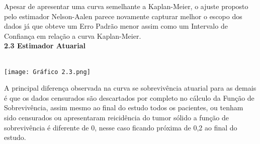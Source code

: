 \documentclass[12pt,a4paper]{article}
\begin{document}
	\vspace{1cm}
	Apesar de apresentar uma curva semelhante a Kaplan-Meier, o ajuste proposto pelo estimador Nelson-Aalen parece novamente capturar melhor o escopo dos dados já que obteve um Erro Padrão menor assim como um Intervalo de Confiança em relação a curva Kaplan-Meier. 
	\vspace{1cm}\\
	\textbf{2.3 Estimador Atuarial}
	\vspace{1cm}\\
	\begin{center}
		\vspace{1cm}\\
		\texttt{[image: Gráfico 2.3.png]}\\
	\end{center}
	\vspace{1cm}
	A principal diferença observada na curva se sobrevivência atuarial para as demais é que os dados censurados são descartados por completo no cálculo da Função de Sobrevivência, assim mesmo ao final do estudo todos os pacientes, ou tenham sido censurados ou apresentaram reicidência do tumor sólido a função de sobrevivência é diferente de 0, nesse caso ficando próxima de 0,2 ao final do estudo. 
\end{document}
